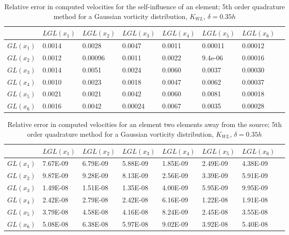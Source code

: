 \documentclass[letterpaper,12pt]{report}
\begin{document}
\begin{table}
\centering
\caption{Relative error in computed velocities for the self-influence of an element; 5th order quadrature method for a Gaussian vorticity distribution, $K_{WL}$, $\delta=0.35h$}\label{table:SelfBSQuad}
\begin{tabular}{l|lllllll}
       &$ LGL(x_1)$             &$ LGL(x_2)$              &$ LGL(x_3)$              &$ LGL(x_4)$             &$ LGL(x_5)$              & $LGL(x_6)$            \\ \hline
$GL(x_1)$ & 0.0014 & 0.0028 & 0.0047  & 0.0011 & 0.00011 & 0.00012\\
$GL(x_2)$ & 0.0012 & 0.00096 & 0.0011  & 0.0022 & 9.4e-06 & 0.00016 \\
$GL(x_3)$ & 0.0014 & 0.0051  & 0.0024  & 0.0060 & 0.0037  & 0.00030 \\
$GL(x_4)$ & 0.0010 & 0.0023  & 0.0018 & 0.0047 & 0.0062  & 0.00037 \\
$GL(x_5)$& 0.0021 & 0.0021  & 0.0042  & 0.0060& 0.0081  & 0.00018 \\
$GL(x_6) $& 0.0016 & 0.0042 & 0.00024 & 0.0067 & 0.0035  & 0.00028
\end{tabular}
\end{table}

\begin{table}
\centering
\caption{Relative error in computed velocities for an element two elements away from the source; 5th order quadrature method for a Gaussian vorticity distribution, $K_{WL}$, $\delta=0.35h$}\label{table:2BSQuad}
\begin{tabular}{l|lllllll}
       &$ LGL(x_1)$             &$ LGL(x_2)$              &$ LGL(x_3)$              &$ LGL(x_4)$             &$ LGL(x_5)$              & $LGL(x_6)$            \\ \hline
$GL(x_1)$ & 7.67E-09 & 6.79E-09 & 5.88E-09 & 1.85E-09 & 2.49E-09 & 4.38E-09 \\
$GL(x_2)$    & 9.87E-09 & 9.28E-09 & 8.13E-09 & 2.56E-09 & 3.39E-09 & 5.91E-09 \\
$GL(x_3)$   & 1.49E-08 & 1.51E-08 & 1.35E-08 & 4.00E-09 & 5.95E-09 & 9.95E-09 \\
$GL(x_4)$    & 2.42E-08 & 2.79E-08 & 2.42E-08 & 6.16E-09 & 1.22E-08 & 1.91E-08 \\
$GL(x_5)$    & 3.79E-08 & 4.58E-08 & 4.16E-08 & 8.24E-09 & 2.45E-08 & 3.55E-08 \\
$GL(x_6)$    & 5.08E-08 & 6.38E-08 & 5.97E-08 & 9.02E-09 & 3.92E-08 & 5.40E-08
\end{tabular}
\end{table}
\end{document}
